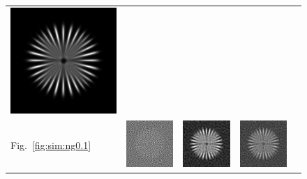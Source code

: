 \documentclass{./packages/optica-article}
\begin{document}
\begin{figure}
\begin{tabular}[t]{l c c c c}
		\includegraphics[scale=0.25]{Simulation deconvolution/ref_conv/RL_50.png}
		\\
		Fig.~\ref{fig:sim:ng0.1}                                                        &
		\includegraphics[scale=0.25]{Simulation deconvolution/ref_ng_0.1/RIF_0.01.png}  &
		\includegraphics[scale=0.25]{Simulation deconvolution/ref_ng_0.1/RIF_1.png}     &
		\includegraphics[scale=0.25]{Simulation deconvolution/ref_ng_0.1/RL_10.png}     &

\end{tabular}
\end{figure}
\end{document}
